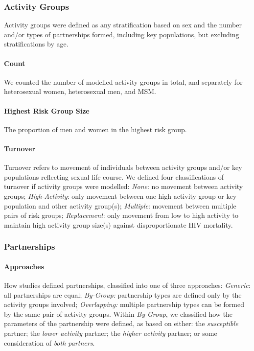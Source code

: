 \subsubsection{Activity Groups}
\label{aaa:defs:act}
Activity groups were defined as any stratification based on
sex and the number and/or types of partnerships formed, including key populations,
but excluding stratifications by age.
\paragraph{Count}
We counted the number of modelled activity groups in total,
and separately for heterosexual women, heterosexual men, and MSM.
\paragraph{Highest Risk Group Size}
The proportion of men and women in the highest risk group.
\paragraph{Turnover}
Turnover refers to movement of individuals between
activity groups and/or key populations reflecting sexual life course.
We defined four classifications of turnover if activity groups were modelled:
\emph{None}: no movement between activity groups;
\emph{High-Activity}: only movement between one high activity group or key population
and other activity group(s);
\emph{Multiple}: movement between multiple pairs of risk groups;
\emph{Replacement}: only movement from low to high activity
to maintain high activity group size(s) against disproportionate HIV mortality.
\subsubsection{Partnerships}
\label{aaa:defs:pt}
\paragraph{Approaches}
How studies defined partnerships, classified into one of three approaches:
\emph{Generic}: all partnerships are equal;
\emph{By-Group:} partnership types are defined only by the activity groups involved;
\emph{Overlapping:} multiple partnership types can be formed by the same pair of activity groups.
Within \emph{By-Group}, we classified how the parameters of the partnership were defined, as based on either:
the \emph{susceptible} partner;
the \emph{lower activity} partner;
the \emph{higher activity} partner; or
some consideration of \emph{both partners}.

